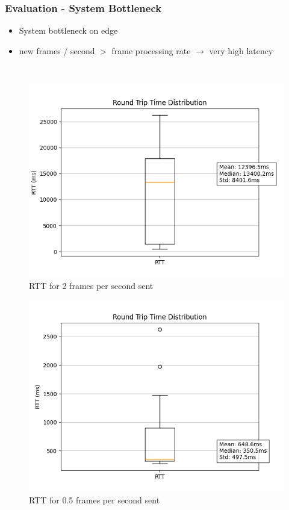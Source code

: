 \documentclass{beamer}
\begin{document}
\begin{frame}
    \frametitle{Evaluation - System Bottleneck}
    \begin{itemize}
        \item System bottleneck on edge
        \item new frames / second $>$ frame processing rate $\rightarrow$ very high latency
    \end{itemize}\
    
\begin{figure}
    \centering
    \begin{minipage}{0.48\textwidth}
        \centering
        \includegraphics[width=\linewidth]{./res/rtt_distribution-local_docker_test20skip.png}
        RTT for 2 frames per second sent
    \end{minipage}
    \hfill
    \begin{minipage}{0.48\textwidth}
        \centering
        \includegraphics[width=\linewidth]{./res/rtt_distribution-docker_test-60skip.png}
        RTT for 0.5 frames per second sent
    \end{minipage}
\end{figure}
\end{frame}



\end{document}

